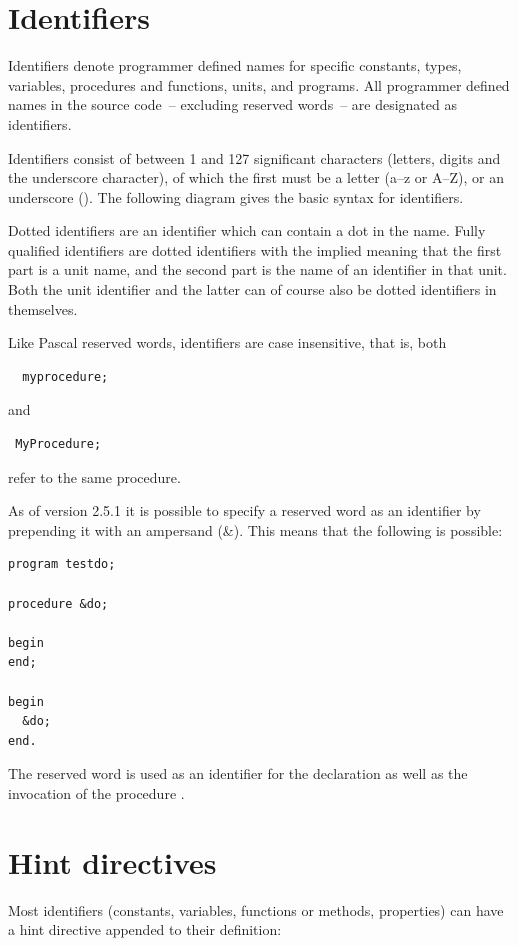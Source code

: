\section{Identifiers}
\label{se:identifiers}
Identifiers denote programmer defined names for specific constants, types,
variables, procedures and functions, units, and programs. All programmer
defined names in the source code~-- excluding reserved words~-- are designated as
identifiers.

Identifiers consist of between 1 and 127 significant characters (letters, digits and
the underscore character), of which the first must be a letter (a--z or A--Z),
or an underscore (\var{\_}).
The following diagram gives the basic syntax for identifiers.

Dotted identifiers are an identifier which can contain a dot in the name. 
Fully qualified identifiers are dotted identifiers with the implied meaning that the first part is a unit name, and the second part is the name of an identifier in that unit. 
Both the unit identifier and the latter can of course also be dotted identifiers in themselves.

Like Pascal reserved words, identifiers are case insensitive, that is, both
\begin{verbatim}
  myprocedure;
\end{verbatim}
and
\begin{verbatim}
 MyProcedure;
\end{verbatim}
refer to the same procedure.

\begin{remark}
As of version 2.5.1 it is possible to specify a reserved word as an identifier by
prepending it with an ampersand (\&). This means that the following is possible:
\begin{verbatim}
program testdo;

procedure &do;

begin
end;

begin
  &do;
end.
\end{verbatim}
The reserved word  is used as an identifier for the declaration as
well as the invocation of the procedure .
\end{remark}

\section{Hint directives}
\label{se:hintdirectives}
Most identifiers (constants, variables, functions or methods, properties) can have a
hint directive appended to their definition:

